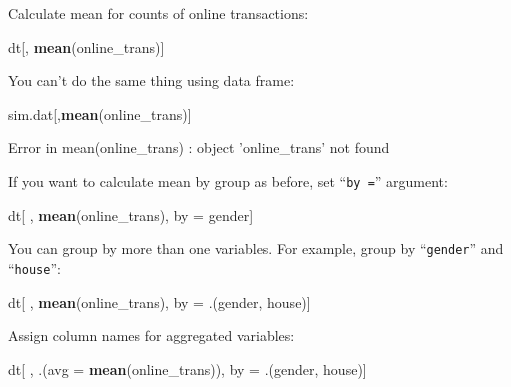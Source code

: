 \documentclass[12pt,]{krantz}
\makeatletter
\newenvironment{Shaded}{\begin{snugshade}}{\end{snugshade}}
\newcommand{\KeywordTok}[1]{\textcolor[rgb]{0.27,0.27,0.27}{\textbf{#1}}}
\newcommand{\DataTypeTok}[1]{\textcolor[rgb]{0.27,0.27,0.27}{#1}}
\newcommand{\StringTok}[1]{\textcolor[rgb]{0.5,0.5,0.5}{#1}}
\newcommand{\NormalTok}[1]{#1}
\newenvironment{kframe}{%
\medskip{}
\setlength{\fboxsep}{.8em}
 \def\at@end@of@kframe{}%
 \ifinner\ifhmode%
  \def\at@end@of@kframe{\end{minipage}}%
  \begin{minipage}{\columnwidth}%
 \fi\fi%
 \def\FrameCommand##1{\hskip\@totalleftmargin \hskip-\fboxsep
 \colorbox{shadecolor}{##1}\hskip-\fboxsep
     \hskip-\linewidth \hskip-\@totalleftmargin \hskip\columnwidth}%
 \MakeFramed {\advance\hsize-\width
   \@totalleftmargin\z@ \linewidth\hsize
   \@setminipage}}%
 {\par\unskip\endMakeFramed%
 \at@end@of@kframe}
\renewenvironment{Shaded}{\begin{kframe}}{\end{kframe}}
\theoremstyle{definition}
\theoremstyle{definition}
\theoremstyle{definition}
\theoremstyle{remark}
\makeatother
\begin{document}
Calculate mean for counts of online transactions:

\begin{Shaded}
\begin{Highlighting}[]
\NormalTok{dt[, }\KeywordTok{mean}\NormalTok{(online_trans)]}
\end{Highlighting}
\end{Shaded}

You can't do the same thing using data frame:

\begin{Shaded}
\begin{Highlighting}[]
\NormalTok{sim.dat[,}\KeywordTok{mean}\NormalTok{(online_trans)]}
\end{Highlighting}
\end{Shaded}

\begin{Shaded}
\begin{Highlighting}[]
\NormalTok{Error in mean(online_trans) : object 'online_trans' not found}
\end{Highlighting}
\end{Shaded}

If you want to calculate mean by group as before, set ``\texttt{by\ =}''
argument:

\begin{Shaded}
\begin{Highlighting}[]
\NormalTok{dt[ , }\KeywordTok{mean}\NormalTok{(online_trans), by =}\StringTok{ }\NormalTok{gender]}
\end{Highlighting}
\end{Shaded}

You can group by more than one variables. For example, group by
``\texttt{gender}'' and ``\texttt{house}'':

\begin{Shaded}
\begin{Highlighting}[]
\NormalTok{dt[ , }\KeywordTok{mean}\NormalTok{(online_trans), by =}\StringTok{ }\NormalTok{.(gender, house)]}
\end{Highlighting}
\end{Shaded}

Assign column names for aggregated variables:

\begin{Shaded}
\begin{Highlighting}[]
\NormalTok{dt[ , .(}\DataTypeTok{avg =} \KeywordTok{mean}\NormalTok{(online_trans)), by =}\StringTok{ }\NormalTok{.(gender, house)]}
\end{Highlighting}
\end{Shaded}
\end{document}
